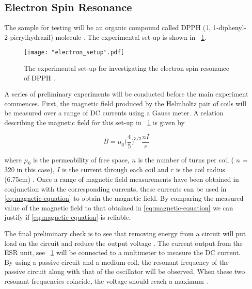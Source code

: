 \documentclass{article}
\newcommand{\figref}[2][\figurename~]{#1\ref{#2}}
\begin{document}
\subsection{Electron Spin Resonance}
\label{ssec:electron-method}

The sample for testing will be an organic compound called DPPH (1, 1-diphenyl-2-picrylhydrazil) molecule \cite{Paper02}. The experimental set-up is shown in \figref{fig:electron_setup}. 

\begin{figure}[h]
\centering
\texttt{[image: "electron\_setup".pdf]}
\caption{The experimental set-up for investigating the electron spin resonance of DPPH \cite{Paper02}.}
\label{fig:electron_setup}
\end{figure}

\vspace{2mm}
\noindent
A series of preliminary experiments will be conducted before the main experiment commences. First, the magnetic field produced by the Helmholtz pair of coils will be measured over a range of DC currents using a Gauss meter. A relation describing the magnetic field for this set-up in \figref{fig:electron_setup} is given by

\begin{equation}
\label{eq:magnetic-equation}
B = \mu_0\Bigg(\frac{4}{5}\Bigg)^{3/2}\frac{nI}{r}
\end{equation}

\vspace{2mm}
\noindent
where $\mu_0$ is the permeability of free space, $n$ is the number of turns per coil ( $n$ = 320 in this case), $I$ is the current through each coil and $r$ is the coil radius (6.75cm) \cite{Paper02}. Once a range of magnetic field measurements have been obtained in conjunction with the corresponding currents, these currents can be used in \eqref{eq:magnetic-equation} to obtain the magnetic field. By comparing the measured value of the magnetic field to that obtained in \eqref{eq:magnetic-equation} we can justify if \eqref{eq:magnetic-equation} is reliable.

\vspace{2mm}
\noindent
The final preliminary check is to see that removing energy from a circuit will put load on the circuit and reduce the output voltage \cite{Paper02}. The current output from the ESR unit, see \figref{fig:electron_setup} will be connected to a multimeter to measure the DC current. By using a passive circuit and a medium coil, the resonant frequency of the passive circuit along with that of the oscillator will be observed. When these two resonant frequencies coincide, the voltage should reach a maximum \cite{Paper02}.
\end{document}
